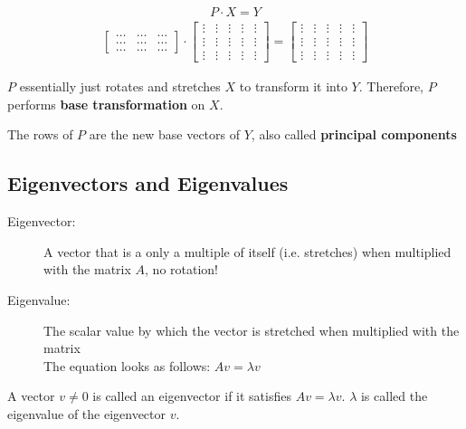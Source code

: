\documentclass[11pt]{article}
\begin{document}
\begin{align*}
    P \cdot X = Y
\end{align*}
\begin{align*}
    \begin{bmatrix}
        \hdots & \hdots & \hdots \\
        \hdots & \hdots & \hdots \\
        \hdots & \hdots & \hdots
    \end{bmatrix}
    \cdot
    \begin{bmatrix}
        \vdots & \vdots & \vdots & \vdots & \vdots \\
        \vdots & \vdots & \vdots & \vdots & \vdots \\
        \vdots & \vdots & \vdots & \vdots & \vdots
    \end{bmatrix}
    =
    \begin{bmatrix}
        \vdots & \vdots & \vdots & \vdots & \vdots \\
        \vdots & \vdots & \vdots & \vdots & \vdots \\
        \vdots & \vdots & \vdots & \vdots & \vdots
    \end{bmatrix}
\end{align*}

\noindent $P$ essentially just rotates and stretches $X$ to transform it into $Y$. Therefore, $P$ performs \textbf{base transformation} on $X$.

\noindent The rows of $P$ are the new base vectors of $Y$, also called \textbf{principal components}

\subsection{Eigenvectors and Eigenvalues}

\begin{description}
    \item[Eigenvector: ] A vector that is a only a multiple of itself (i.e. stretches) when multiplied with the matrix $A$, no rotation!
    \item[Eigenvalue: ] The scalar value by which the vector is stretched when multiplied with the matrix \\
          The equation looks as follows: $Av = \lambda v$
\end{description}

\noindent A vector $ v \neq 0$ is called an eigenvector if it satisfies $Av = \lambda v$. $\lambda$ is called the eigenvalue of the eigenvector $v$.
\end{document}
